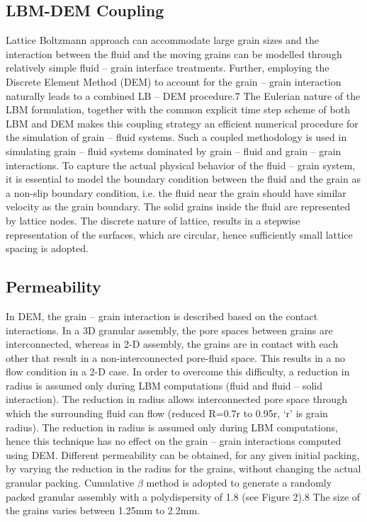 \subsection{LBM-DEM Coupling}

Lattice Boltzmann approach can accommodate large grain sizes and the 
interaction between the fluid and the moving grains can be modelled through 
relatively simple fluid – grain interface treatments. Further, employing the 
Discrete Element Method (DEM) to account for the grain – grain interaction 
naturally leads to a combined LB – DEM procedure.7 The Eulerian nature of the 
LBM formulation, together with the common explicit time step scheme of both LBM 
and DEM makes this coupling strategy an efficient numerical procedure for the 
simulation of grain – fluid systems. Such a coupled methodology is used in 
simulating grain – fluid systems dominated by grain – fluid and grain – grain 
interactions. To capture the actual physical behavior of the fluid – grain 
system, it is essential to model the boundary condition between the fluid and 
the grain as a non-slip boundary condition, i.e. the fluid near the grain 
should have similar velocity as the grain boundary. The solid grains inside the 
fluid are represented by lattice nodes. The discrete nature of lattice, results 
in a stepwise representation of the surfaces, which are circular, hence 
sufficiently small lattice spacing is adopted. 

\subsection{Permeability}

In DEM, the grain – grain interaction is described based on the contact 
interactions. In a 3D granular assembly, the pore spaces between grains are 
interconnected, whereas in 2-D assembly, the grains are in contact with each 
other that result in a non-interconnected pore-fluid space. This results in a 
no flow condition in a 2-D case. In order to overcome this difficulty, a 
reduction in radius is assumed only during LBM computations (fluid and fluid – 
solid interaction). The reduction in radius allows interconnected pore space 
through which the surrounding fluid can flow (reduced R=0.7r to 0.95r, ‘r’ is 
grain radius). The reduction in radius is assumed only during LBM computations, 
hence this technique has no effect on the grain – grain interactions computed 
using DEM. Different permeability can be obtained, for any given initial 
packing, by varying the reduction in the radius for the grains, without 
changing the actual granular packing. Cumulative $\beta$ method is adopted to 
generate a randomly packed granular assembly with a polydispersity of 1.8 (see 
Figure 2).8 The size of the grains varies between 1.25mm to 2.2mm. 

